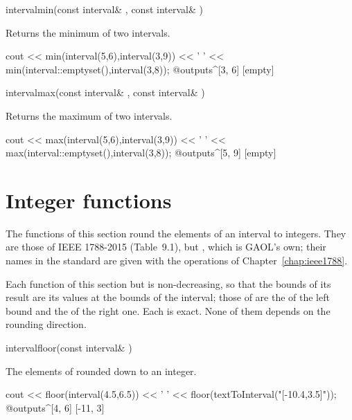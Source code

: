 \begin{deffun}{interval}{min}{(const interval\& , const interval\& )}
  \begin{operation}
  \end{operation}
  Returns the minimum of two intervals.
  \begin{example}
cout << min(interval(5,6),interval(3,9)) << ' '
     << min(interval::emptyset(),interval(3,8));
@outputs^[3, 6] [empty]~
  \end{example}
\end{deffun}

\begin{deffun}{interval}{max}{(const interval\& , const interval\& )}
  \begin{operation}
  \end{operation}
  Returns the maximum of two intervals.
\begin{example}
cout << max(interval(5,6),interval(3,9)) << ' '
     << max(interval::emptyset(),interval(3,8));
@outputs^[5, 9] [empty]~
\end{example}
\end{deffun}

\section{Integer functions}\label{sec:functions-integer}
%

The functions of this section round the elements of an interval to
integers. They are those of IEEE 1788-2015 (Table~9.1), but ,
which is GAOL's own; their names in the
standard are given with the operations of Chapter~\ref{chap:ieee1788}.

\begin{Prop}\label{prop:functions-integer}
Each function of this section but  is non-decreasing, so that
      the bounds of its result are its values at the bounds of the interval; those
      of  are the  of the left bound and the 
      of the right one. Each is exact.
None of them depends on the rounding direction.
\end{Prop}

\begin{deffun}{interval}{floor}{(const interval\& )}
  \begin{operation}
  \end{operation}
  The elements of  rounded down to an integer.
  \begin{example}
cout << floor(interval(4.5,6.5)) << ' '
     << floor(textToInterval("[-10.4,3.5]"));
@outputs^[4, 6] [-11, 3]~
  \end{example}
\end{deffun}

